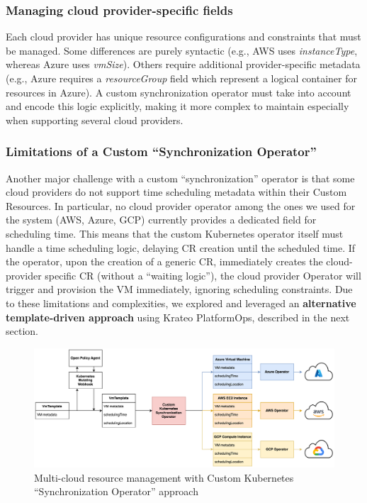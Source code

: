 \subsubsection{Managing cloud provider-specific fields}

Each cloud provider has unique resource configurations and constraints that must be managed.
Some differences are purely syntactic (e.g., AWS uses \textit{instanceType}, whereas Azure uses \textit{vmSize}).
Others require additional provider-specific metadata (e.g., Azure requires a \textit{resourceGroup} field which represent a logical container for resources in Azure).
A custom synchronization operator must take into account and encode this logic explicitly, making it more complex to maintain especially when supporting several cloud providers.

\subsubsection{Limitations of a Custom ``Synchronization Operator''}
\label{sec:limitations_custom_operator}

Another major challenge with a custom ``synchronization'' operator is that some cloud providers do not support time scheduling metadata within their Custom Resources. 
In particular, no cloud provider operator among the ones we used for the system (AWS, Azure, GCP) currently provides a dedicated field for scheduling time.
This means that the custom Kubernetes operator itself must handle a time scheduling logic, delaying CR creation until the scheduled time.
If the operator, upon the creation of a generic CR, immediately creates the cloud-provider specific CR (without a ``waiting logic''), the cloud provider Operator will trigger and provision the VM immediately, ignoring scheduling constraints.
Due to these limitations and complexities, we explored and leveraged an \textbf{alternative template-driven approach} using Krateo PlatformOps, described in the next section.

\begin{figure}[htb]
  \centering
  \includegraphics[width=1\linewidth]{images/k8s_operator.png}
  \caption{Multi-cloud resource management with Custom Kubernetes ``Synchronization Operator'' approach}
  \label{fig:k8s_operator}
\end{figure}

